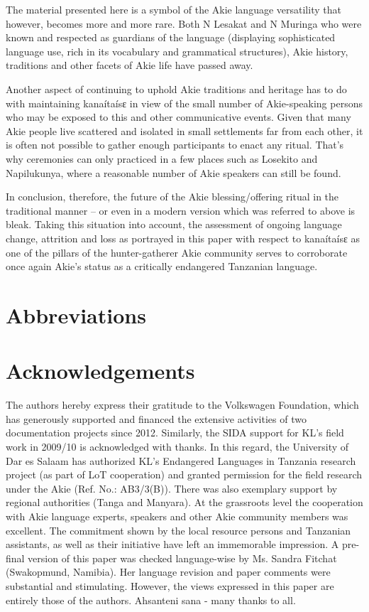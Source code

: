\documentclass[output=paper,colorlinks,citecolor=brown]{langscibook}
\begin{document}
The material presented here is a symbol of the Akie language versatility that however, becomes more and more rare. Both N Lesakat and N Muringa who were known and respected as guardians of the language (displaying sophisticated language use, rich in its vocabulary and grammatical structures), Akie history, traditions and other facets of Akie life  have passed away. 

Another aspect of continuing to uphold Akie traditions and heritage has to do with maintaining kanaítaísɛ in view of the small number of Akie-speaking persons who may be exposed to this and other communicative events. Given that many Akie people live scattered and isolated in small settlements far from each other, it is often not possible to gather enough participants to enact any ritual. That’s why ceremonies can only practiced in a few places such as Losekito and Napilukunya, where a reasonable number of Akie speakers can still be found.

In conclusion, therefore, the future of the Akie blessing/offering ritual in the traditional manner – or even in a modern version which was referred to above is bleak. Taking this situation into account, the assessment of ongoing language change, attrition and loss as portrayed in this paper with respect to kanaítaísɛ as one of the pillars of the hunter-gatherer Akie community serves to corroborate once again Akie’s status as a critically endangered Tanzanian language.


\section*{Abbreviations}


\section*{Acknowledgements}
The authors hereby express their gratitude to the Volkswagen Foundation, which has generously supported and financed the extensive activities of two documentation projects since 2012. Similarly, the SIDA support for KL's field work in 2009/10 is acknowledged with thanks. In this regard, the University of Dar es Salaam has authorized KL's Endangered Languages in Tanzania research project (as part of LoT cooperation) and granted permission for the field research under the Akie (Ref. No.: AB3/3(B)). There was also exemplary support by regional authorities (Tanga and Manyara). At the grassroots level the cooperation with Akie language experts, speakers and other Akie community members was excellent. The commitment shown by the local resource persons and Tanzanian assistants, as well as their initiative have left an immemorable impression. A pre-final version of this paper was checked language-wise by Ms. Sandra Fitchat (Swakopmund, Namibia). Her language revision and paper comments were substantial and stimulating. However, the views expressed in this paper are entirely those of the authors. 
Ahsanteni sana - many thanks to all.
\end{document}
